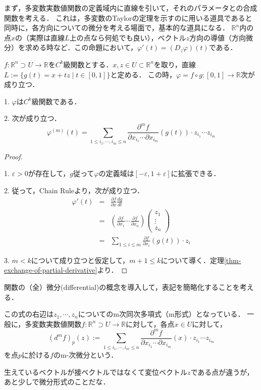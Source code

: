 \documentclass[uplatex, dvipdfmx]{jsreport}
\begin{document}
まず，多変数実数値関数の定義域内に直線を引いて，それのパラメータとの合成関数を考える．
これは，多変数のTaylorの定理を示すのに用いる道具であると同時に，各方向についての微分を考える場面で，基本的な道具になる．
$\mathbb{R}^n$内の点$x$の（実際は直線$L$上の点なら何処でも良い），ベクトル$z$方向の導値（方向微分）を求める時など．この命題において，$\varphi'(t)=(D_z\varphi)(t)$である．
\begin{proposition}
    $f:\mathbb{R}^n\supset U\to\mathbb{R}$を$C^k$級関数とする．$x,z\in U\subset\mathbb{R}^n$を取り，直線$L:=\{g(t)=x+tz\mid t\in [0,1]\}$と定める．
    この時，$\varphi=f\circ g:[0,1]\to\mathbb{R}$次が成り立つ．
    
    1. $\varphi$は$C^k$級関数である．

    2. 次が成り立つ．
    \[ \varphi^{(m)}(t) = \sum_{1\le i_1,\cdots,i_m\le n}\frac{\partial^m f}{\partial x_{i_1}\cdots\partial x_{i_m}}(g(t))\cdot z_{i_1}\cdots z_{i_m} \]

\end{proposition}
\begin{proof}　

    1. $\varepsilon>0$が存在して，$g$従って$\varphi$の定義域は$[-\varepsilon,1+\varepsilon]$に拡張できる．

    2. 従って，Chain Ruleより，次が成り立つ．
    \begin{eqnarray*} \varphi'(t) &=& \frac{\partial f}{\partial x}\frac{d g}{dt} \\
        &=& (\frac{\partial f}{\partial x_1} \cdots \frac{\partial f}{\partial x_n})\left(\begin{array}{c}z_1 \\ \vdots \\ z_n\end{array}\right) \\
        &=& \sum_{1\le i\le m} \frac{\partial f}{\partial x_i}(g(t))\cdot z_i
    \end{eqnarray*}
    
    3. $m<k$について成り立つと仮定して，$m+1\le k$について導く．定理\ref{thm-exchange-of-partial-derivative}より．
\end{proof}

関数の（全）微分(differential)の概念を導入して，表記を簡略化することを考える．
\begin{definition}
    この式の右辺は$z_1,\cdots,z_n$についてのm次同次多項式（m形式）となっている．
    一般に，多変数実数値関数$f:\mathbb{R}^n\supset U\to\mathbb{R}$に対して，各点$x\in U$に対して，
    \[ (d^mf)_p(z):=\sum_{1\le i_1,\cdots,i_m\le n}\frac{\partial^m f}{\partial x_{i_1}\cdots\partial x_{i_m}}(x)\cdot z_{i_1}\cdots z_{i_m} \]
    を点$p$に於ける$f$のm-次微分という．
\end{definition}
生えているベクトルが接ベクトルではなくて変位ベクトル$z$である点が違うが，あと少しで微分形式のことだな．
\end{document}
